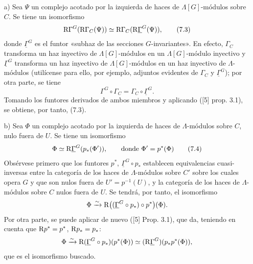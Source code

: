 a) Sea $\Psi$ un complejo acotado por la izquierda de haces de $\Lambda[G]$-módulos sobre $C$. Se tiene un isomorfismo
\[
\mathrm{R}\Gamma^G(\mathrm{R}\Gamma_C(\Psi))\simeq\mathrm{R}\Gamma_C(\mathrm{R}\underline{\Gamma}^G(\Psi)),
\tag{7.3}
\]
donde $\underline{\Gamma}^G$ es el funtor «subhaz de las secciones $G$-invariantes». En efecto, $\Gamma_C$ transforma un haz inyectivo de $\Lambda[G]$-módulos en un $\Lambda[G]$-módulo inyectivo y $\underline{\Gamma}^G$ transforma un haz inyectivo de $\Lambda[G]$-módulos en un haz inyectivo de $\Lambda$-módulos (utilícense para ello, por ejemplo, adjuntos evidentes de $\Gamma_C$ y $\underline{\Gamma}^G$); por otra parte, se tiene
\[
\Gamma^G\circ\Gamma_C=\Gamma_C\circ\underline{\Gamma}^G.
\]
Tomando los funtores derivados de ambos miembros y aplicando ([5] prop. 3.1), se obtiene, por tanto, (7.3).

b) Sea $\Phi$ un complejo acotado por la izquierda de haces de $\Lambda$-módulos sobre $C$, nulo fuera de $U$. Se tiene un isomorfismo
\[
\Phi\simeq \mathrm{R}\underline{\Gamma}^G(p_*(\Phi')),
\qquad\text{donde } \Phi'=p^*(\Phi)
\tag{7.4}
\]
Obsérvese primero que los funtores $p^*$, $\underline{\Gamma}^G\circ p_*$ establecen equivalencias cuasi-inversas entre la categoría de los haces de $\Lambda$-módulos sobre $C'$ sobre los cuales opera $G$ y que son nulos fuera de $U'=p^{-1}(U)$, y la categoría de los haces de $\Lambda$-módulos sobre $C$ nulos fuera de $U$. Se tendrá, por tanto, el isomorfismo
\[
\Phi\xrightarrow{\sim} \mathrm{R}\bigl((\underline{\Gamma}^G\circ p_*)\circ p^*\bigr)(\Phi).
\]
Por otra parte, se puede aplicar de nuevo ([5] Prop. 3.1), que da, teniendo en cuenta que $\mathrm{R} p^*=p^*$, $\mathrm{R} p_*=p_*$:
\[
\Phi\xrightarrow{\sim} \mathrm{R}(\underline{\Gamma}^G\circ p_*)(p^*(\Phi))
\simeq (\mathrm{R}\underline{\Gamma}^G)(p_*p^*(\Phi)),
\]
que es el isomorfismo buscado.
